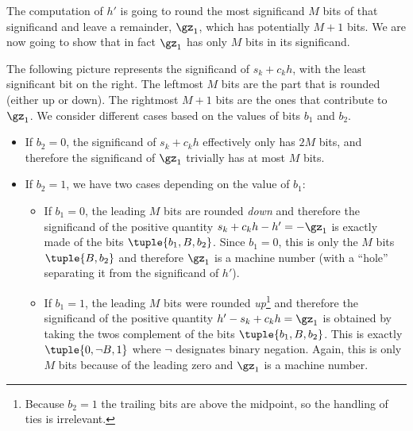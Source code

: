 \documentclass[10pt, a4paper, twoside]{basestyle}
\begin{document}
The computation of $h'$ is going to round the most significand $M$ bits of that significand and leave a remainder, $\gz_1$, which has potentially $M + 1$ bits.  We are now going to show that in fact $\gz_1$ has only $M$ bits in its significand.

The following picture represents the significand of $s_k + c_k h$, with the least significant bit on the right.  The leftmost $M$ bits are the part that is rounded (either up or down).  The rightmost $M + 1$ bits are the ones that contribute to $\gz_1$.  We consider different cases based on the values of bits $b_1$ and $b_2$.
\begin{center}
\end{center}

\begin{itemize}
\item If $b_2 = 0$, the significand of $s_k + c_k h$ effectively only has $2 M$ bits, and therefore the significand of $\gz_1$ trivially has at most $M$ bits.
\item If $b_2 = 1$, we have two cases depending on the value of $b_1$:
\begin{itemize}
\item If $b_1 = 0$, the leading $M$ bits are rounded \emph{down} and therefore the significand of the positive quantity $s_k + c_k h - h' = -\gz_1$ is exactly made of the bits $\tuple{b_1, B, b_2}$.  Since $b_1 = 0$, this is only the $M$ bits $\tuple{B, b_2}$ and therefore $\gz_1$ is a machine number (with a ``hole'' separating it from the significand of $h'$).
\item If $b_1 = 1$, the leading $M$ bits were rounded \emph{up}\footnote{Because $b_2 = 1$ the trailing bits are above the midpoint, so the handling of ties is irrelevant.} and therefore the significand of the positive quantity $h' - s_k + c_k h = \gz_1$ is obtained by taking the twos complement of the bits $\tuple{b_1, B, b_2}$.  This is exactly $\tuple{0, \neg B, 1}$ where $\neg$ designates binary negation.  Again, this is only $M$ bits because of the leading zero and $\gz_1$ is a machine number.
\end{itemize}
\end{itemize}
\end{document}
